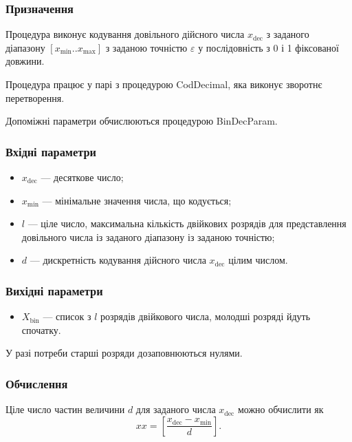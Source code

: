 \documentclass[a4paper, 12pt]{article}
\numberwithin{equation}{section}
\begin{document}
\subsubsection*{Призначення}

Процедура виконує кодування довільного дійсного числа $x_{\text{dec}}$ з заданого діапазону $[x_{\text{min}}..x_{\text{max}}]$ з заданою точністю $\varepsilon$ у послідовність з 0 і 1 фіксованої довжини. \medskip

Процедура працює у парі з процедурою CodDecimal, яка виконує зворотнє перетворення. \medskip

Допоміжні параметри обчислюються процедурою BinDecParam.

\subsubsection*{Вхідні параметри}

\begin{itemize}
    \item $x_{\text{dec}}$ --- десяткове число;
    \item $x_{\text{min}}$ --- мінімальне значення числа, що кодується;
    \item $l$ --- ціле число, максимальна кількість двійкових розрядів для представлення довільного числа із заданого діапазону із заданою точністю;
    \item $d$ --- дискретність кодування дійсного числа $x_{\text{dec}}$ цілим числом.
\end{itemize}

\subsubsection*{Вихідні параметри}

\begin{itemize}
    \item $X_{\text{bin}}$ --- список з $l$ розрядів двійкового числа, молодші розряді йдуть спочатку. 
\end{itemize}

У разі потреби старші розряди дозаповнюються нулями.

\subsubsection*{Обчислення}

Ціле число частин величини $d$ для заданого числа $x_{\text{dec}}$ можно обчислити як
\begin{equation}
    xx = \left[ \frac{x_{\text{dec}} - x_{\text{min}}}{d} \right].
\end{equation}
\end{document}
